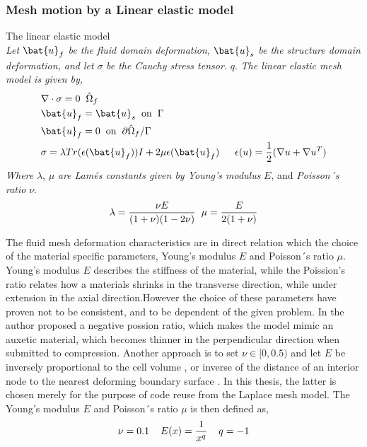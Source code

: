 \subsubsection*{Mesh motion by a Linear elastic model}
\begin{equat}
The linear elastic model \\ \textit{Let} $\bat{u}_f$ \textit{be the fluid domain deformation,} $\bat{u}_s$ \textit{be the structure domain deformation, and let} $\sigma$ \textit{be the Cauchy stress tensor.} $q$. \textit{The linear elastic mesh model is given by, }   
\begin{align*}
&\nabla \cdot \sigma = 0 \hspace{2mm} \hat{\Omega}_f\\
&\bat{u}_f = \bat{u}_s \hspace{2mm} \text{on} \hspace{2mm}  \Gamma \\
&\bat{u}_f = 0 \hspace{2mm} \text{on} \hspace{2mm} \partial \hat{\Omega}_f / \Gamma \\
&\sigma = \lambda Tr(\epsilon(\bat{u}_f)) I + 2 \mu \epsilon(\bat{u}_f) \hspace{2mm}
&\epsilon(u) = \frac{1}{2}(\nabla u + \nabla  u^T)
\end{align*}
\textit{Where} $\lambda$, $\mu$ \textit{are Lamés constants given by Young's modulus}  $E$, and \textit{Poisson´s ratio } $\nu$.
\begin{align*}
\lambda = \frac{\nu E}{(1 + \nu)(1 - 2\nu)} \hspace{2mm} \mu = \frac{E}{2(1 + \nu)}
\end{align*}
\end{equat}

The fluid mesh deformation characteristics are in direct relation which the choice of the material specific parameters, Young's modulus $E$ and Poisson´s ratio $\mu$.  Young's modulus $E$ describes the stiffness of the material, while the Poission's ratio relates how a materials shrinks in the transverse direction, while under extension in the axial direction.However the choice of these parameters have proven not to be consistent, and to be dependent of the given problem.
In \cite{Wicka} the author proposed a negative possion ratio, which makes the model mimic an auxetic material, which becomes thinner in the perpendicular direction when submitted to compression. Another approach is to set  $\nu \in [0, 0.5)$ and let $E$ be inversely proportional to the cell volume \cite{Biedron}, or inverse of the distance of an interior node to the nearest deforming boundary surface \cite{MM2016}. In this thesis, the latter is chosen merely for the purpose of code reuse from the Laplace mesh model. The Young's modulus $E$ and Poisson´s ratio $\mu$ is then  defined as,
\begin{align*}
\nu = 0.1 \hspace{4mm} E(x) = \frac{1}{x^q}  \hspace{4mm} q = -1
\end{align*}

